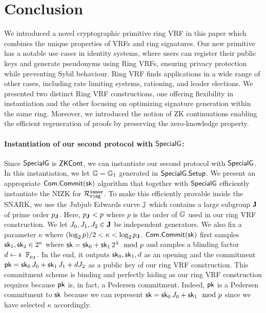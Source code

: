 \section{Conclusion}
\label{sec:conclusion}

We introduced a novel cryptographic primitive ring VRF in this paper which combines the unique properties of VRFs  and ring signatures. Our new primitive has a notable use cases in identity systems, where users can register their public keys and generate pseudonyms using Ring VRFs, ensuring privacy protection while preventing Sybil behaviour. Ring VRF finds applications in a wide range of other cases, including rate limiting systems, rationing, and leader elections. We presented two distinct Ring VRF constructions, one offering flexibility in instantiation and the other focusing on optimizing signature generation within the same ring. Moreover, we introduced the notion of ZK continuations enabling the efficient regeneration of proofs by preserving the zero-knowledge property.

\paragraph{Instantiation of our second protocol with $ {\mathsf{SpecialG}} $:} Since $ {\mathsf{SpecialG}} $ is $ {\mathsf{ZKCont}} $, we can instantiate our second protocol with $ {\mathsf{SpecialG}}$. In this instantiation, we let $ {\mathbb{G}} = \mathbb{G}_1 $ generated in $ {\mathsf{SpecialG}}.{\mathsf{Setup}} $.  
We present an appropriate $ \mathsf{Com}.\mathsf{Commit}(\mathsf{sk}) $ algorithm that together with $ {\mathsf{SpecialG}} $ efficiently instantiate the NIZK for $ \mathcal{R}_{\mathtt{ring}}^{\mathtt{inner}} $. To make this efficiently provable inside the SNARK,  we use the Jubjub Edwards curve ${\mathbb{J}}$ which contains a large subgroup ${\mathbf{J}}$ of prime order $p_{\mathbf{J}}$. Here, $p_{\mathbf{J}} < p$ where $ p $ is the order of ${\mathbb{G}}$ used in our ring VRF construction. We let $J_0,J_1,J_2 \in {\mathbf{J}}$ be independent generators. We also fix a parameter $ \kappa $ where $(\log_2 p)/2 < \kappa < \log_2 p_{\mathbf{J}}$. $ \mathsf{Com}.\mathsf{Commit}(\mathsf{sk}) $ first samples $\mathsf{sk}_1,\mathsf{sk}_2 \in 2^\kappa$  where $\mathsf{sk} = \mathsf{sk}_0 + \mathsf{sk}_1 \, 2^{\lambda} \mod p$ and samples a blinding factor $d \leftsample \F_{p_\grJ} $. In the end, it outputs $ \mathsf{sk}_0, \mathsf{sk}_1,d $ as an opening and the commitment $\mathsf{pk}=\mathsf{sk}_0\, J_0 + \mathsf{sk}_1\, J_1 + d J_2$ as a public key of our ring VRF construction. This commitment scheme is binding and perfectly hiding as our ring VRF construction requires because $ \mathsf{pk} $ is, in fact, a Pedersen commitment. Indeed, $\mathsf{pk}$ is a Pedersen commitment to $\mathsf{sk}$ because we can represent $ \mathsf{sk} = \mathsf{sk}_0\, J_0 + \mathsf{sk}_1 \mod p$ since we have selected $ \kappa $ accordingly.

